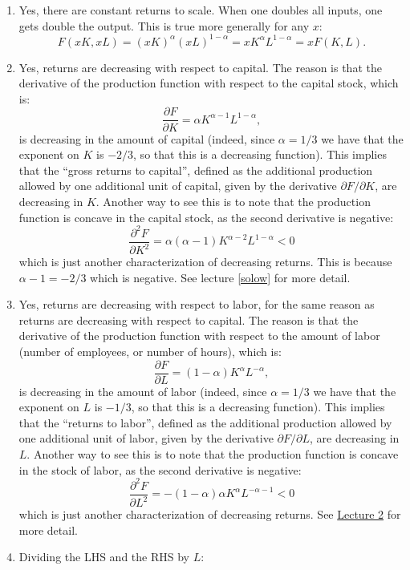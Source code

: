 \documentclass[]{book}
\begin{document}
\begin{enumerate}
\def\labelenumi{\arabic{enumi}.}
\item
  Yes, there are constant returns to scale. When one doubles all inputs,
  one gets double the output. This is true more generally for any \(x\):
  \[F(xK,xL)=(xK)^\alpha (xL)^{1-\alpha} = x K^\alpha L^{1-\alpha}= x F(K,L).\]
\item
  Yes, returns are decreasing with respect to capital. The reason is
  that the derivative of the production function with respect to the
  capital stock, which is:
  \[\frac{\partial F}{\partial K}=\alpha K^{\alpha-1} L^{1-\alpha},\] is
  decreasing in the amount of capital (indeed, since \(\alpha=1/3\) we
  have that the exponent on \(K\) is \(-2/3\), so that this is a
  decreasing function). This implies that the ``gross returns to
  capital'', defined as the additional production allowed by one
  additional unit of capital, given by the derivative
  \(\partial F/\partial K\), are decreasing in \(K\). Another way to see
  this is to note that the production function is concave in the capital
  stock, as the second derivative is negative:
  \[\frac{\partial^2 F}{\partial K^2}=\alpha (\alpha-1) K^{\alpha-2} L^{1-\alpha}<0\]
  which is just another characterization of decreasing returns. This is
  because \(\alpha-1=-2/3\) which is negative. See lecture \ref{solow}
  for more detail.
\item
  Yes, returns are decreasing with respect to labor, for the same reason
  as returns are decreasing with respect to capital. The reason is that
  the derivative of the production function with respect to the amount
  of labor (number of employees, or number of hours), which is:
  \[\frac{\partial F}{\partial L}=(1-\alpha) K^{\alpha} L^{-\alpha},\]
  is decreasing in the amount of labor (indeed, since \(\alpha=1/3\) we
  have that the exponent on \(L\) is \(-1/3\), so that this is a
  decreasing function). This implies that the ``returns to labor'',
  defined as the additional production allowed by one additional unit of
  labor, given by the derivative \(\partial F/\partial L\), are
  decreasing in \(L\). Another way to see this is to note that the
  production function is concave in the stock of labor, as the second
  derivative is negative:
  \[\frac{\partial^2 F}{\partial L^2}=-(1-\alpha)\alpha K^{\alpha} L^{-\alpha-1}<0\]
  which is just another characterization of decreasing returns. See
  \href{lecture2.html}{Lecture 2} for more detail.
\item
  Dividing the LHS and the RHS by \(L\):

\end{enumerate}
\end{document}
